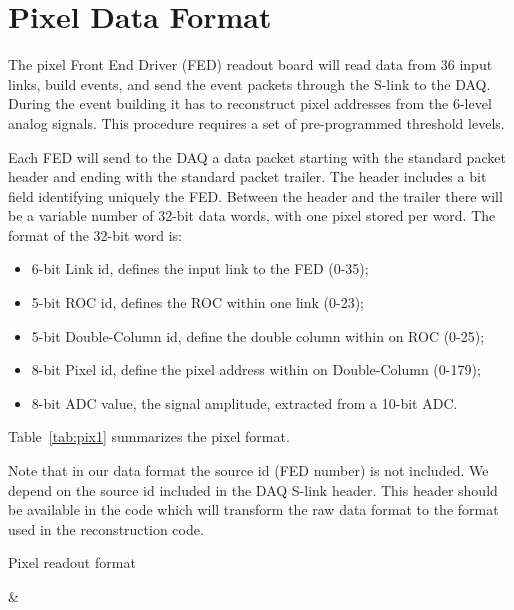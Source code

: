 \section{Pixel Data Format}\label{sec:Pixel}
The pixel Front End Driver (FED) readout board will read 
data from 36 input links, build events, and send the event
packets through the S-link to the DAQ.
During the event building it has to reconstruct pixel
addresses from the 6-level analog signals. This procedure
requires a set of pre-programmed threshold levels. 

Each FED will send to the DAQ a data packet starting with the standard
packet header and ending with the standard packet trailer.
The header includes a bit field identifying uniquely the FED.
Between the header and the trailer there will be a variable number of 
32-bit data words, with one pixel stored per word.
The format of the 32-bit word is:
\begin{itemize}
\item 6-bit Link id, defines the input link to the FED (0-35);
\item 5-bit ROC id, defines the ROC within one link (0-23);
\item 5-bit Double-Column id, define the double column within
on ROC (0-25);
\item 8-bit Pixel id, define the pixel address within on
Double-Column (0-179);
\item 8-bit ADC value, the signal amplitude, extracted from a
10-bit ADC.
\end{itemize}
Table~\ref{tab:pix1} summarizes the pixel format.

Note that in our data format the source id (FED number) is not 
included. We depend on the source id included in the DAQ S-link 
header. This header should be available in the code which will 
transform the raw data format to the format used in the reconstruction 
code.

\begin{table}[htb]
  \caption{Pixel readout format}\label{tab:pix1}
    \begin{bittabular}{32}
      & \bitNumFourByte
    \end{bittabular}
\end{table}

